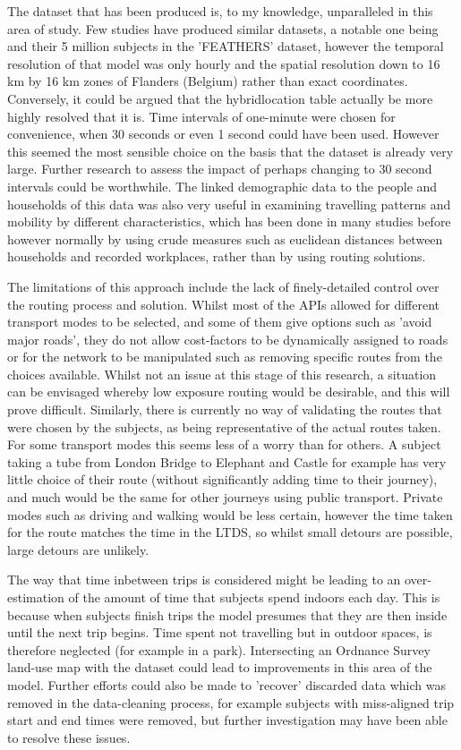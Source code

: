 The dataset that has been produced is, to my knowledge, unparalleled in this area of study. Few studies have produced similar datasets, a notable one being \cite{Dhondt2012} and their 5 million subjects in the 'FEATHERS' dataset, however the temporal resolution of that model was only hourly and the spatial resolution down to 16 km by 16 km zones of Flanders (Belgium) rather than exact coordinates. Conversely, it could be argued that the hybrid\textunderscore location table actually be more highly resolved that it is. Time intervals of one-minute were chosen for convenience, when 30 seconds or even 1 second could have been used. However this seemed the most sensible choice on the basis that the dataset is already very large. Further research to assess the impact of perhaps changing to 30 second intervals could be worthwhile. The linked demographic data to the people and households of this data was also very useful in examining travelling patterns and mobility by different characteristics, which has been done in many studies before however normally by using crude measures such as euclidean distances between households and recorded workplaces, rather than by using routing solutions.

The limitations of this approach include the lack of finely-detailed control over the routing process and solution. Whilst most of the APIs allowed for different transport modes to be selected, and some of them give options such as 'avoid major roads', they do not allow cost-factors to be dynamically assigned to roads or for the network to be manipulated such as removing specific routes from the choices available. Whilst not an issue at this stage of this research, a situation can be envisaged whereby low exposure routing would be desirable, and this will prove difficult. Similarly, there is currently no way of validating the routes that were chosen by the subjects, as being representative of the actual routes taken. For some transport modes this seems less of a worry than for others. A subject taking a tube from London Bridge to Elephant and Castle for example has very little choice of their route (without significantly adding time to their journey), and much would be the same for other journeys using public transport. Private modes such as driving and walking would be less certain, however the time taken for the route matches the time in the LTDS, so whilst small detours are possible, large detours are unlikely.

The way that time inbetween trips is considered might be leading to an over-estimation of the amount of time that subjects spend indoors each day. This is because when subjects finish trips the model presumes that they are then inside until the next trip begins. Time spent not travelling but in outdoor spaces, is therefore neglected (for example in a park). Intersecting an Ordnance Survey land-use map with the dataset could lead to improvements in this area of the model. Further efforts could also be made to 'recover' discarded data which was removed in the data-cleaning process, for example subjects with miss-aligned trip start and end times were removed, but further investigation may have been able to resolve these issues.

